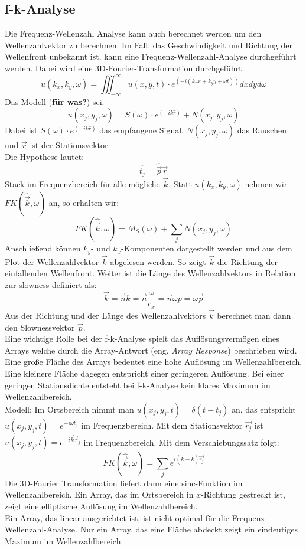 \subsection{f-k-Analyse}
Die Frequenz-Wellenzahl Analyse kann auch berechnet werden um den Wellenzahlvektor zu berechnen.
Im Fall, das Geschwindigkeit und Richtung der Wellenfront unbekannt ist, kann eine Frequenz-Wellenzahl-Analyse durchgeführt werden. Dabei wird eine 3D-Fourier-Transformation durchgeführt:
\begin{equation}
u(k_{x},k_{y},\omega) = \iiint_{-\infty}^{\infty} u(x,y,t)\cdot e^{(-i(k_{x}x+k_{y}y+\omega t))} dxdyd\omega
\end{equation}
Das Modell (\textbf{für was?}) sei:
\[
u(x_{j},y_{j},\omega) = S(\omega)\cdot e^{(-ik\hat{r})}+N(x_{j},y_{j},\omega)
\]
{\small Dabei ist $S(\omega)\cdot e^{({-ik\hat{r}})}$ das empfangene Signal, $N(x_{j},y_{j},\omega)$ das Rauschen und $\vec{r}$ ist der Stationsvektor.}\\
Die Hypothese lautet:
\[
\hat{t_{j}} = \hat{\vec{p}} \vec{r}
\]
Stack im Frequenzbereich für alle mögliche $\vec{k}$.
Statt $u(k_{x}, k_{y}, \omega)$ nehmen wir $FK(\hat{\vec{k}},\omega)$ an, so erhalten wir:
\begin{equation}
FK(\hat{\vec{k}},\omega) = M_S(\omega)+\sum_j N(x_{j},y_{j},\omega)
\end{equation}
Anschließend können $k_{y}$- und $k_{x}$-Komponenten dargestellt werden und aus dem Plot der Wellenzahlvektor $\vec{k}$ abgelesen werden. So zeigt $\vec{k}$ die Richtung der einfallenden Wellenfront.
Weiter ist die Länge des Wellenzahlvektors in Relation zur slowness definiert als:
\begin{equation}
\vec{k} = \vec{n} k = \vec{n} \dfrac{\omega}{c_x} = \vec{n} \omega p= \omega \vec{p} 
\end{equation}
Aus der Richtung und der Länge des Wellenzahlvektors $\vec{k}$ berechnet man dann den Slownessvektor $\vec{p}$.\\
Eine wichtige Rolle bei der f-k-Analyse spielt das Auflösungsvermögen eines Arrays welche durch die Array-Antwort (eng. \textsl{Array Response}) beschrieben wird. Eine große Fläche des Arrays bedeutet eine hohe Auflösung im Wellenzahlbereich. Eine kleinere Fläche dagegen entspricht einer geringeren Auflösung. Bei einer geringen Stationsdichte entsteht bei f-k-Analyse kein klares Maximum im Wellenzahlbereich.\\
Modell: Im Ortsbereich nimmt man $u(x_j,y_j,t) = \delta(t-t_j)$ an, das entspricht $u(x_j,y_j,t)= e^{-i\omega t_{j}}$ im Frequenzbereich. Mit dem Stationsvektor $\vec{r_{j}}$ ist $u(x_j,y_j,t) = e^{-i\vec{k}\vec{r}_j}$  im Frequenzbereich.
Mit dem Verschiebungssatz folgt:
\begin{equation}
FK(\hat{\vec{k}},\omega) = \sum_{j} e^{i( \hat{k}-k)\vec{r_{j}}}
\end{equation}
Die 3D-Fourier Transformation liefert dann eine sinc-Funktion im Wellenzahlbereich. Ein Array, das im Ortsbereich  in $x$-Richtung gestreckt ist, zeigt eine elliptische Auflösung im Wellenzahlbereich.\\
Ein Array, das linear ausgerichtet ist, ist nicht optimal für die Frequenz-Wellenzahl-Analyse. Nur ein Array, das eine Fläche abdeckt zeigt ein eindeutiges Maximum im Wellenzahlbereich.